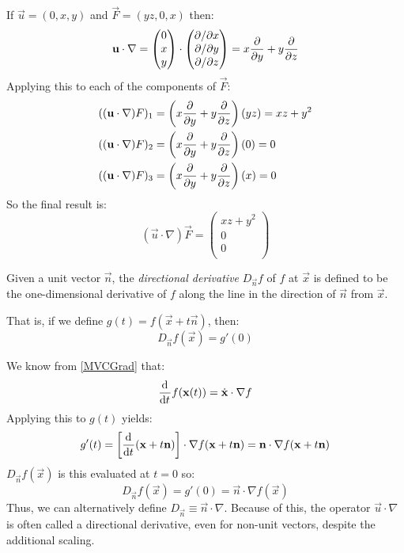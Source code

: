 \documentclass[../main.tex]{subfiles}
\begin{document}
\begin{example}
  If $\vec{u} = (0, x, y)$ and $\vec{F} = (yz, 0, x)$ then:
  \[
    \vec{u} \cdot \nabla = \begin{pmatrix}
    0 \\
    x \\
    y \\
    \end{pmatrix} \cdot \begin{pmatrix}
    \partial/\partial x \\
    \partial/\partial y \\
    \partial/\partial z \\
    \end{pmatrix} =
    x \pderiv{}{y} + y \pderiv{}{z}
  \]
  Applying this to each of the components of $\vec{F}$:
  \begin{align*}
    ((\vec{u} \cdot \nabla)F)_1 &= \left(x \pderiv{}{y} + y \pderiv{}{z}\right)(yz) = xz + y^2 \\
    ((\vec{u} \cdot \nabla)F)_2 &= \left(x \pderiv{}{y} + y \pderiv{}{z}\right)(0) = 0 \\
    ((\vec{u} \cdot \nabla)F)_3 &= \left(x \pderiv{}{y} + y \pderiv{}{z}\right)(x) = 0
  \end{align*}
  So the final result is:
  \[
    (\vec{u} \cdot \nabla)\vec{F} = \begin{pmatrix}
    xz + y^2 \\
    0 \\
    0 \\
    \end{pmatrix}
  \]
\end{example}
\begin{definition}
  Given a unit vector $\vec{n}$, the \textit{directional derivative} $D_{\vec{n}} f$ of $f$ at $\vec{x}$ is defined to be the one-dimensional derivative of $f$ along the line in the direction of $\vec{n}$ from $\vec{x}$.

  That is, if we define $g(t) = f(\vec{x} + t\vec{n})$, then:
  \label{directionalDerivative}
  \[
    D_{\vec{n}} f(\vec{x}) = g'(0)
  \]
\end{definition}
We know from \cref{MVCGrad} that:
\[
  \deriv{}{t}f(\vec{x}(t)) = \dot{\vec{x}} \cdot \nabla f
\]
Applying this to $g(t)$ yields:
\[
  g'(t) = \left[\deriv{}{t}(\vec{x} + t \vec{n})\right] \cdot \nabla f(\vec{x} + t\vec{n}) = \vec{n} \cdot \nabla f(\vec{x} + t\vec{n})
\]
$D_{\vec{n}} f(\vec{x})$ is this evaluated at $t = 0$ so:
\[
  D_{\vec{n}} f(\vec{x}) = g'(0) = \vec{n} \cdot \nabla f(\vec{x})
\]
Thus, we can alternatively define $D_{\vec{n}} \equiv \vec{n} \cdot \nabla$.
Because of this, the operator $\vec{u} \cdot \nabla$ is often called a directional derivative, even for non-unit vectors, despite the additional scaling.
\end{document}
